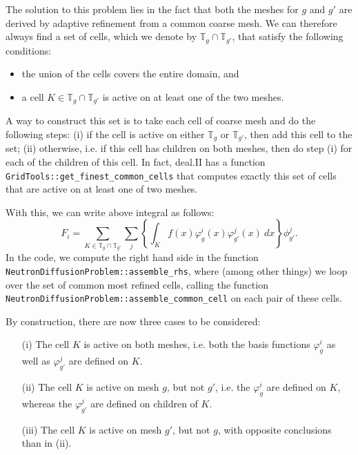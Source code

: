 \documentclass{article}
\begin{document}
The solution to this problem lies in the fact that both the meshes for $g$ and
$g'$ are derived by adaptive refinement from a common coarse mesh. We can
therefore always find a set of cells, which we denote by ${\mathbb T}_g \cap
{\mathbb T}_{g'}$, that satisfy the following conditions:
\begin{itemize}
\item the union of the cells covers the entire domain, and
\item a cell $K \in {\mathbb T}_g \cap {\mathbb T}_{g'}$ is active on at least
  one of the two meshes.
\end{itemize}
A way to construct this set is to take each cell of coarse mesh and do the
following steps: (i) if the cell is active on either ${\mathbb T}_g$ or
${\mathbb T}_{g'}$, then add this cell to the set; (ii) otherwise, i.e. if
this cell has children on both meshes, then do step (i) for each of the
children of this cell. In fact, deal.II has a function
\texttt{GridTools::get\_finest\_common\_cells} that computes exactly this set
of cells that are active on at least one of two meshes.

With this, we can write above integral as follows:
\begin{equation}
  F_i 
  = 
  \sum_{K \in {\mathbb T}_g \cap {\mathbb T}_{g'}}
  \sum_j \left\{\int_K f(x) \varphi_g^i(x) \varphi_{g'}^j(x) 
  \ dx \right\} \phi_{g'}^j.
\end{equation}
 In the code, we
compute the right hand side in the function
\texttt{NeutronDiffusionProblem::assemble\_rhs}, where (among other things) we
loop over the set of common most refined cells, calling the function
\texttt{NeutronDiffusionProblem::assemble\_common\_cell} on each pair of
these cells.

By construction, there are now three cases to be considered:
\begin{itemize}
\item[(i)] The cell $K$ is active on both meshes, i.e. both the basis
  functions $\varphi_g^i$ as well as $\varphi_{g'}^j$ are defined on $K$.
\item[(ii)] The cell $K$ is active on mesh $g$, but not $g'$, i.e. the
  $\varphi_g^i$  are defined on $K$, whereas the $\varphi_{g'}^j$ are defined
  on children of $K$.
\item[(iii)] The cell $K$ is active on mesh $g'$, but not $g$, with opposite
  conclusions than in (ii).
\end{itemize}
\end{document}
